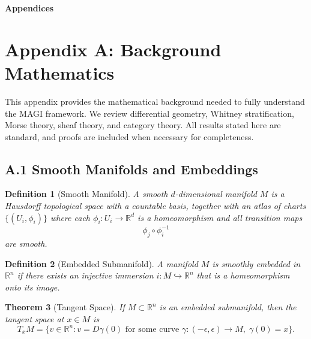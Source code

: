 \documentclass[11pt,a4paper,twocolumn]{article}
\newtheorem{theorem}{Theorem}[section]
\newtheorem{definition}[theorem]{Definition}
\begin{document}
\twocolumn[ %
\vspace{1em}
]

\onecolumn
\begin{center}
\Large\bfseries Appendices
\end{center}
\vspace{1.5em}


\section*{Appendix A: Background Mathematics}

This appendix provides the mathematical background needed to fully
understand the MAGI framework. We review differential geometry,
Whitney stratification, Morse theory, sheaf theory, and category theory.
All results stated here are standard, and proofs are included when
necessary for completeness.


\subsection*{A.1 Smooth Manifolds and Embeddings}

\begin{definition}[Smooth Manifold]
A smooth $d$-dimensional manifold $M$ is a Hausdorff topological space
with a countable basis, together with an atlas of charts
$\{(U_i,\phi_i)\}$ where each $\phi_i : U_i \to \mathbb{R}^d$ is a
homeomorphism and all transition maps
\[
\phi_j \circ \phi_i^{-1}
\]
are smooth.
\end{definition}

\begin{definition}[Embedded Submanifold]
A manifold $M$ is smoothly embedded in $\mathbb{R}^n$ if there exists an
injective immersion $i : M \hookrightarrow \mathbb{R}^n$ that is a
homeomorphism onto its image.
\end{definition}

\begin{theorem}[Tangent Space]
If $M \subset \mathbb{R}^n$ is an embedded submanifold, then the tangent
space at $x \in M$ is
\[
T_x M = \{v \in \mathbb{R}^n : v = D\gamma(0) \text{ for some curve }
\gamma : (-\epsilon,\epsilon) \to M,\; \gamma(0)=x\}.
\]
\end{theorem}
\end{document}
